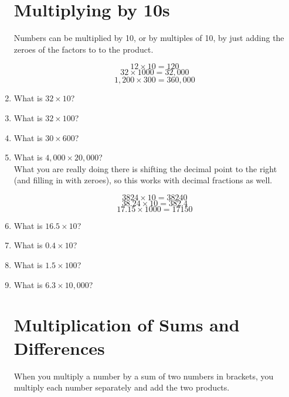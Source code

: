 \documentclass[12pt]{article}
\begin{document}
\begin{enumerate}
\section*{Multiplying by 10s}

Numbers can be multiplied by 10, or by multiples of 10, by just adding the zeroes of the factors to to the product.

$$12 \times 10 = 120$$
$$32 \times 1000 = 32,000$$
$$1,200 \times 300 = 360,000$$

\item What is $32 \times 10$?
\item What is $32 \times 100$?
\item What is $30 \times 600$?
\item What is $4,000 \times 20,000$?\\

What you are really doing there is shifting the decimal point to the right (and filling in with zeroes), so this works with decimal fractions as well.

$$3824 \times 10 = 38240$$
$$38.24 \times 10 = 382.4$$
$$17.15 \times 1000 = 17150$$

\item What is $16.5 \times 10$?
\item What is $0.4 \times 10$?
\item What is $1.5 \times 100$?
\item What is $6.3 \times 10,000$?

\newpage

\section*{Multiplication of Sums and Differences}
When you multiply a number by a sum of two numbers in brackets, you multiply each number separately and add the two products.

\begin{center}
\end{center}


\end{enumerate}
\end{document}
